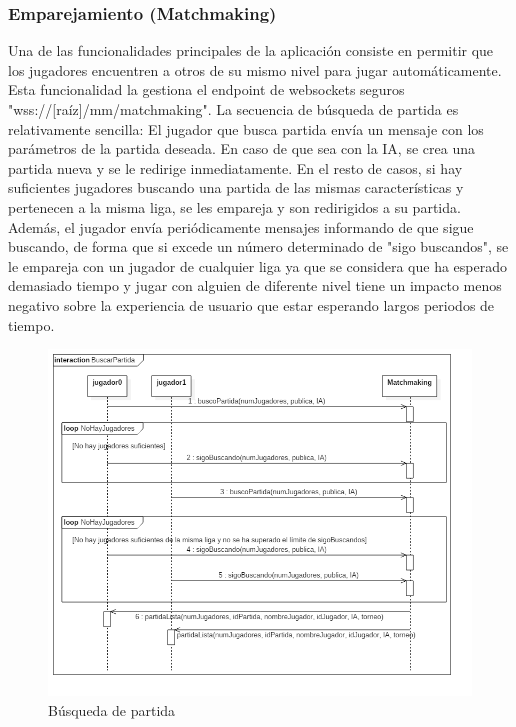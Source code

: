 \subsubsection{Emparejamiento (Matchmaking)}
Una de las funcionalidades principales de la aplicación consiste en permitir que los jugadores encuentren a otros de su mismo nivel
para jugar automáticamente. Esta funcionalidad la gestiona el endpoint de websockets seguros "wss://[raíz]/mm/matchmaking". 
La secuencia de búsqueda de partida es relativamente sencilla: El jugador que busca partida envía un mensaje con los parámetros de 
la partida deseada. En caso de que sea con la IA, se crea una partida nueva y se le redirige inmediatamente. En el resto de casos,
si hay suficientes jugadores buscando una partida de las mismas características y pertenecen a la misma liga, se les empareja y son
redirigidos a su partida. Además, el jugador envía periódicamente mensajes informando de que sigue buscando, de forma que si excede
un número determinado de "sigo buscandos", se le empareja con un jugador de cualquier liga ya que se considera que ha esperado 
demasiado tiempo y jugar con alguien de diferente nivel tiene un impacto menos negativo sobre la experiencia de usuario que estar esperando
largos periodos de tiempo.\\

\begin{figure}[H]
  \includegraphics[width=\linewidth]{figuras/diagramasSecuencia/buscarPartida.png}
  \caption{Búsqueda de partida}
  \label{fig:buscarPartida}
\end{figure}

